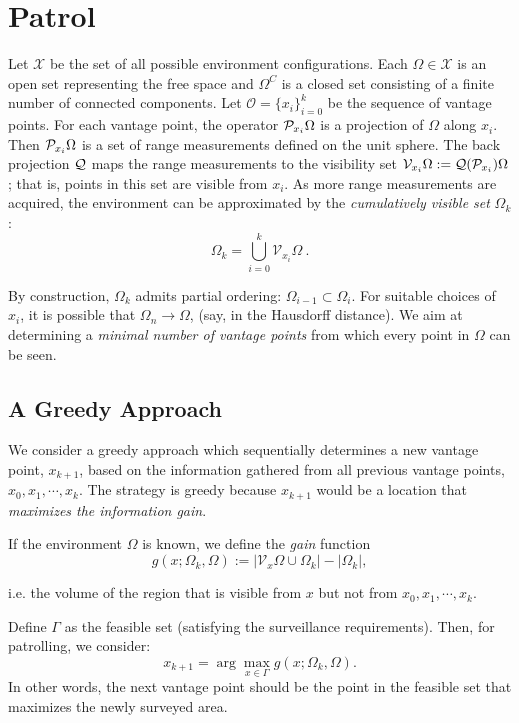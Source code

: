 \section{Patrol}


Let $\mathcal{X}$ be the set of all possible environment configurations.
Each $\Omega \in \mathcal{X}$ is an open set representing the free space
and $\Omega^C$ is a closed set consisting of a finite number of connected components.
Let $\mathcal{O} = \{x_i\}_{i=0}^k$ be the sequence of vantage points. For
each vantage point, the operator $\mathcal{P}_{x_i}\Omega$ is a projection of
$\Omega$ along $x_i$. Then $\mathcal{P}_{x_i}\Omega$ is a set of range measurements defined
on the unit sphere.  The back projection $\mathcal{Q}$ maps the range
measurements to the visibility set
$\mathcal{V}_{x_i} \Omega := \mathcal{Q} (\mathcal{P}_{x_i}) \Omega$;
that is, points in this set are visible from $x_i$.
As more range measurements are acquired, the
environment can be approximated by the \emph{cumulatively visible set} $\Omega_k$:
$$\Omega_k = \bigcup_{i=0}^k \mathcal{V}_{x_i}\Omega \ . $$

By construction, $\Omega_k$ admits partial ordering: $\Omega_{i-1} \subset \Omega_{i}$.
For suitable choices of $x_i$, it is possible that $\Omega_n \to \Omega$,
(say, in the Hausdorff distance).  We aim at determining a \emph{minimal number
of  vantage points}  from which every point in $\Omega$ can be seen.


\subsection{A Greedy Approach}
We consider a greedy approach which sequentially determines a new vantage point, $x_{k+1}$, based on the information gathered from all previous vantage points, $x_0,x_1,\cdots, x_{k}$.
The strategy is greedy because $x_{k+1}$ would be a location that \emph{maximizes the information gain}.

If the environment $\Omega$ is known, we define the \emph{gain} function
$$g(x;\Omega_k, \Omega) := |   \mathcal{V}_x \Omega \cup \Omega_k| - |\Omega_k |, $$

i.e. the volume of the region that is visible from $x$ but not from $x_0,x_1,\cdots,x_{k}$. 

Define $\Gamma$ as the feasible set (satisfying the surveillance requirements).
Then, for patrolling, we consider:
\begin{equation} x_{k+1} = \arg \max_{x\in \Gamma} g(x;\Omega_k, \Omega).\end{equation}
In other words, the next vantage point should be the point in the feasible set that maximizes the newly surveyed area. 